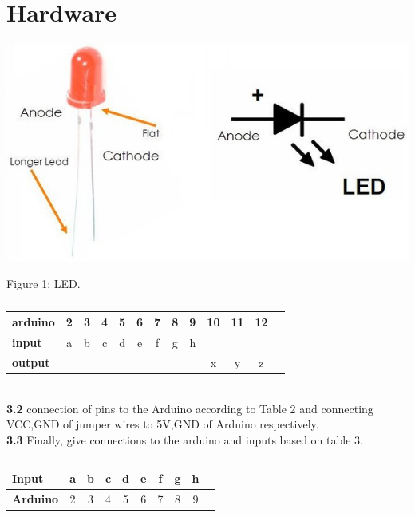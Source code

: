 \documentclass[10pt, a4paper]{article}
\begin{document}
	\section{Hardware}
    \begin{center}
\includegraphics[scale=.20]{led.jpeg}
\end{center}
Figure 1: LED.
	\begin{table}[htbp]
    \begin{center}
    \begin{tabular}{|l|c|c|c|c|c|c|c|c|c|c|c|c} \hline \textbf{arduino}
  & 2 & 3 & 4 & 5 & 6 & 7 & 8 & 9 & 10 & 11 & 12 \\
 \hline
 \textbf{input} & a & b & c & d & e & f & g & h & & &  \\ \hline
\textbf{output} & & & & & & & &  & x & y & z \\ \hline
\end{tabular}   
\end{center}
\caption{\label{table:dummytable} }
\end{table}
\\	\textbf{3.2}
	connection of pins to the Arduino according to Table 2 and connecting VCC,GND of jumper wires to 5V,GND of Arduino respectively.
\\ \textbf{3.3}
Finally, give connections to the arduino and inputs based on table 3.
	\begin{table}[htbp]
    \begin{center}
    \begin{tabular}{|l|c|c|c|c|c|c|c|c|c|} \hline 
\textbf{Input} & a & b & c & d & e & f & g & h  \\ \hline
\textbf{Arduino} & 2 & 3 & 4 & 5& 6 & 7 & 8 & 9\\ \hline
\end{tabular}   
\end{center}
\caption{\label{table:dummytable} }
\end{table}
\end{document}
